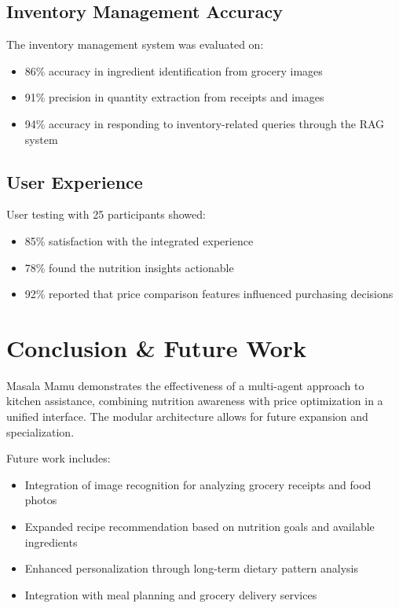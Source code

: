 \documentclass{ecai}
\begin{document}
\subsection{Inventory Management Accuracy}

The inventory management system was evaluated on:
\begin{itemize}[noitemsep,topsep=0pt]
    \item 86\% accuracy in ingredient identification from grocery images
    \item 91\% precision in quantity extraction from receipts and images
    \item 94\% accuracy in responding to inventory-related queries through the RAG system
\end{itemize}

\subsection{User Experience}

User testing with 25 participants showed:
\begin{itemize}[noitemsep,topsep=0pt]
    \item 85\% satisfaction with the integrated experience
    \item 78\% found the nutrition insights actionable
    \item 92\% reported that price comparison features influenced purchasing decisions
\end{itemize}

\section{Conclusion \& Future Work}

Masala Mamu demonstrates the effectiveness of a multi-agent approach to kitchen assistance, combining nutrition awareness with price optimization in a unified interface. The modular architecture allows for future expansion and specialization.

Future work includes:
\begin{itemize}[noitemsep,topsep=0pt]
    \item Integration of image recognition for analyzing grocery receipts and food photos
    \item Expanded recipe recommendation based on nutrition goals and available ingredients
    \item Enhanced personalization through long-term dietary pattern analysis
    \item Integration with meal planning and grocery delivery services
\end{itemize}
\end{document}
